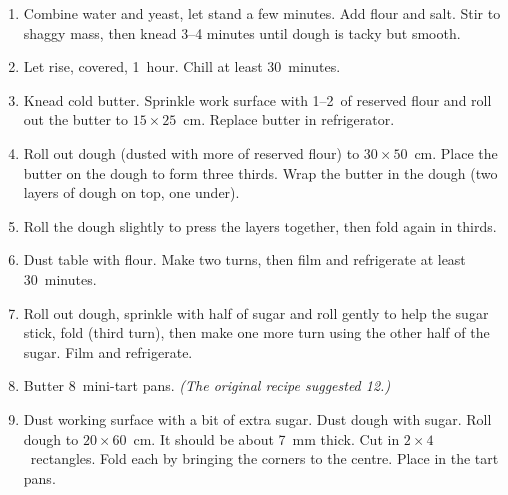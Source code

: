 \altdish{}

\begin{ingredients}
\end{ingredients}


\begin{recipe}
  \begin{enumerate}

  \item Combine water and yeast, let stand a few minutes.  Add flour
    and salt.  Stir to shaggy mass, then knead 3--4 minutes until
    dough is tacky but smooth.
    
  \item Let rise, covered, 1~hour.  Chill at least 30~minutes.
    
  \item Knead cold butter.  Sprinkle work surface with 1--2~\tbsp of
    reserved flour and roll out the butter to $15\times 25$~cm.
    Replace butter in refrigerator.
    
  \item Roll out dough (dusted with more of reserved flour) to
    $30\times 50$~cm.  Place the butter on the dough to form three
    thirds.  Wrap the butter in the dough (two layers of dough on top,
    one under).
    
  \item Roll the dough slightly to press the layers together, then
    fold again in thirds.
    
  \item Dust table with flour.  Make two turns, then film and
    refrigerate at least 30~minutes.
    
  \item Roll out dough, sprinkle with half of sugar and roll gently to
    help the sugar stick, fold (third turn), then make one more turn
    using the other half of the sugar.  Film and refrigerate.
    
  \item Butter 8~mini-tart pans.  \textit{(The original recipe
      suggested 12.)}
    
  \item Dust working surface with a bit of extra sugar.  Dust dough
    with sugar.  Roll dough to $20\times 60$~cm.  It should be about
    7~mm thick.  Cut in $2\times 4$~rectangles.  Fold each by bringing
    the corners to the centre.  Place in the tart pans.
    

\end{enumerate}
\end{recipe}
